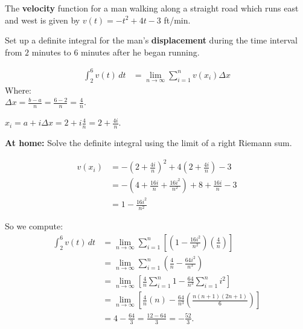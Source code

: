 \documentclass[handout, nooutcomes]{ximera}
\renewenvironment{freeResponse}{
\ifhandout\setbox0\vbox\bgroup\else
\begin{trivlist}\item[\hskip \labelsep\bfseries Solution:\hspace{2ex}]
\fi}
{\ifhandout\egroup\else
\end{trivlist}
\fi}
\renewcommand{\d}{\,d}
\newcommand{\dfn}{\textbf}
\begin{document}
\begin{problem}
  The \dfn{velocity} function for a man walking along a straight road which runs east and west is given by $v(t) = -t^2 + 4t - 3$ ft/min.
  \begin{enumerate}
    
  \item  Set up a definite integral for the man's \dfn{displacement} during the time interval from $2$ minutes to $6$ minutes after he began running.
    \begin{freeResponse}
      \begin{align*}
        \int_2^6 v(t) \d t &= \lim_{n \to \infty} \sum_{i=1}^n v(x_i) \Delta x
      \end{align*}
      Where:  \\	
      $\Delta x = \frac{b-a}{n} = \frac{6-2}{n} = \frac{4}{n}$.
      
      $x_i = a + i \Delta x = 2 + i \frac{4}{n} = 2 + \frac{4i}{n}$.
    \end{freeResponse}
    
  \item  \dfn{At home:}  Solve the definite integral using the limit of a right Riemann sum.
    \begin{freeResponse}
      \begin{align*}
        v(x_i) &= -\left(2 + \frac{4i}{n} \right)^2 + 4 \left( 2 + \frac{4i}{n} \right) - 3  \\
               &= - \left( 4 + \frac{16i}{n} + \frac{16i^2}{n^2} \right) + 8 + \frac{16i}{n} - 3  \\
               &= 1 - \frac{16i^2}{n^2}
      \end{align*}
      
      So we compute:
      \begin{align*}
        \int_2^6 v(t) \d t &= \lim_{n \to \infty} \sum_{i=1}^n \left[ \left( 1 - \frac{16i^2}{n^2} \right) \left( \frac{4}{n} \right) \right]  \\
                           &= \lim_{n \to \infty} \sum_{i=1}^n \left( \frac{4}{n} - \frac{64 i^2}{n^3} \right)  \\
                           &= \lim_{n \to \infty} \left[ \frac{4}{n} \sum_{i=1}^n 1 - \frac{64}{n^3} \sum_{i=1}^n i^2 \right]  \\
                           &= \lim_{n \to \infty} \left[ \frac{4}{n} (n) - \frac{64}{n^3} \left( \frac{n(n+1)(2n+1)}{6} \right) \right]  \\
                           &= 4 - \frac{64}{3} = \frac{12-64}{3} = - \frac{52}{3}.
      \end{align*}
    \end{freeResponse}
    

\end{enumerate}
\end{problem}
\end{document}
